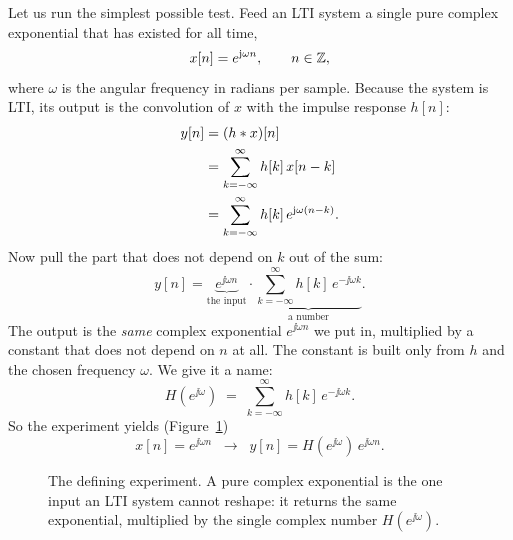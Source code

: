 Let us run the simplest possible test. Feed an LTI system a single pure complex
exponential that has existed for all time,
\[
  x[n] = e^{\mathrm{j} \omega n}, \qquad n \in \mathbb{Z},
\]
where $\omega$ is the angular frequency in radians per sample. Because the
system is LTI, its output is the convolution of $x$ with the impulse response
$h[n]$:
\begin{align*}
  y[n] &= (h \ast x)[n] \\
       &= \sum_{k=-\infty}^{\infty} h[k]\, x[n-k] \\
       &= \sum_{k=-\infty}^{\infty} h[k]\, e^{\mathrm{j} \omega (n-k)}.
\end{align*}
Now pull the part that does not depend on $k$ out of the sum:
\[
  y[n] = \underbrace{e^{\jj \omega n}}_{\text{the input}}
         \cdot \underbrace{\sum_{k=-\infty}^{\infty} h[k]\, e^{-\jj \omega k}}_{\text{a number}} .
\]
The output is the \emph{same} complex exponential
$e^{\jj\omega n}$ we put in, multiplied by a constant that does not depend on
$n$ at all. The constant is built only from $h$ and the chosen frequency
$\omega$. We give it a name:
\begin{equation}
  H(e^{\jj\omega}) \;=\; \sum_{k=-\infty}^{\infty} h[k]\, e^{-\jj \omega k}.
  \label{ch14:Hdef}
\end{equation}
So the experiment yields (Figure~\ref{ch14:fig-eigen})
\begin{equation}
  x[n] = e^{\jj\omega n} \;\;\longrightarrow\;\; y[n] = H(e^{\jj\omega})\, e^{\jj\omega n}.
  \label{ch14:eigenrelation}
\end{equation}

\begin{figure}[H]
\centering
{}
\caption{The defining experiment. A pure complex exponential is the one input an
LTI system cannot reshape: it returns the same exponential, multiplied by the
single complex number $H(e^{\jj\omega})$.}
\label{ch14:fig-eigen}
\end{figure}

